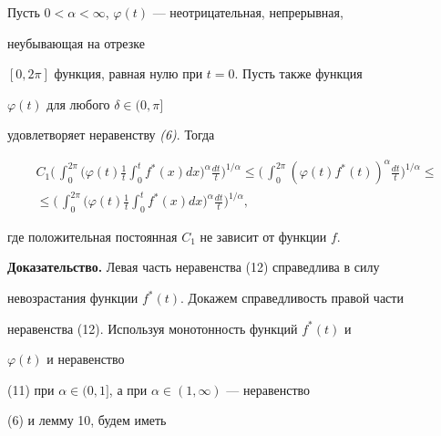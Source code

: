 \begin{lem}


Пусть $0<\alpha<\infty$, $\varphi(t)$ --- неотрицательная, непрерывная,


неубывающая на отрезке


$[0,2\pi]$ функция, равная нулю при $t=0$. Пусть также функция


$\varphi(t)$ для любого $\delta\in(0,\pi]$


удовлетворяет неравенству {\em (6)}. Тогда


\begin{multline}


C_1\biggl(\,\int^{2\pi}_0\biggl(\varphi(t)\frac{1}{t}\int^t_0


f^*(x)dx\biggr)^\alpha\frac{dt}{t}\biggr)^{1/\alpha}\le


\biggl(\,\int^{2\pi}_0(\varphi(t)f^*(t))^\alpha\frac{dt}{t}


\biggr)^{1/\alpha}\le \\


\le\biggl(\,\int^{2\pi}_0\biggl(\varphi(t)\frac{1}{t}


\int^t_0f^*(x)dx\biggr)^\alpha\frac{dt}{t}\biggr)^{1/\alpha},


\end{multline}


где положительная постоянная $C_1$ не зависит от функции $f$.


\end{lem}





{\bf Доказательство.} Левая часть неравенства (12) справедлива в силу


невозрастания функции $f^*(t)$. Докажем справедливость правой части


неравенства (12). Используя монотонность функций $f^*(t)$ и


$\varphi(t)$ и неравенство


(11) при $\alpha\in(0,1]$, а при $\alpha\in(1,\infty)$ --- неравенство


(6) и лемму 10, будем иметь


